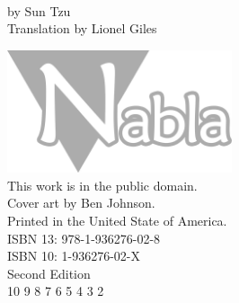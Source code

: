 \documentclass[11pt,openany]{memoir}
\begin{document}
\frontmatter

\vspace*{\droptitle}
\begin{center}
\vspace*{1.0in}
 \\
\vspace*{1.0in}
\Large{by Sun Tzu} \\
\vspace*{0.2in}
\Large{Translation by Lionel Giles} \\
\end{center}
\thispagestyle{empty}

\newpage
\vspace*{1.0in}
\begin{center}
\includegraphics[width=2.6in]{nabla} \\
\vspace*{0.4in}
This work is in the public domain. \\
Cover art by Ben Johnson. \\
Printed in the United State of America. \\
\vspace*{0.4in}
ISBN 13: 978-1-936276-02-8 \\
ISBN 10: 1-936276-02-X \\
\vspace*{0.4in}
Second Edition \\
10 9 8 7 6 5 4 3 2 \\
\end{center}
\thispagestyle{empty}

\newpage
{}
\renewcommand*{\cftchapterfont}{\normalfont}
\renewcommand*{\cftchapterpagefont}{\normalfont}
\begin{large}
\tableofcontents*
\end{large}
\thispagestyle{empty}

\mainmatter
\end{document}
